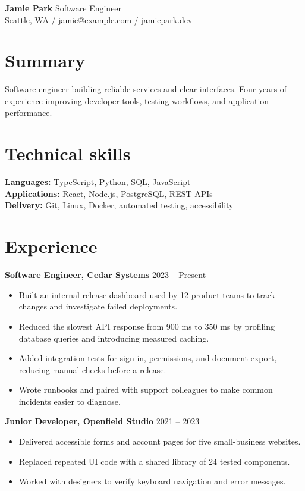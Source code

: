 \documentclass[10pt,a4paper]{article}
\begin{document}
{\LARGE\bfseries Jamie Park} \hfill {\large Software Engineer}\\[5pt]
Seattle, WA \enspace / \enspace
\href{mailto:jamie@example.com}{jamie@example.com} \enspace / \enspace
\href{https://example.com}{jamiepark.dev}

\section{Summary}
Software engineer building reliable services and clear interfaces. Four years
of experience improving developer tools, testing workflows, and application performance.

\section{Technical skills}
\textbf{Languages:} TypeScript, Python, SQL, JavaScript\\
\textbf{Applications:} React, Node.js, PostgreSQL, REST APIs\\
\textbf{Delivery:} Git, Linux, Docker, automated testing, accessibility

\section{Experience}
\textbf{Software Engineer, Cedar Systems} \hfill 2023 -- Present
\begin{itemize}
  \item Built an internal release dashboard used by 12 product teams to track changes
        and investigate failed deployments.
  \item Reduced the slowest API response from 900 ms to 350 ms by profiling database
        queries and introducing measured caching.
  \item Added integration tests for sign-in, permissions, and document export, reducing
        manual checks before a release.
  \item Wrote runbooks and paired with support colleagues to make common incidents
        easier to diagnose.
\end{itemize}
\textbf{Junior Developer, Openfield Studio} \hfill 2021 -- 2023
\begin{itemize}
  \item Delivered accessible forms and account pages for five small-business websites.
  \item Replaced repeated UI code with a shared library of 24 tested components.
  \item Worked with designers to verify keyboard navigation and error messages.
\end{itemize}
\end{document}

